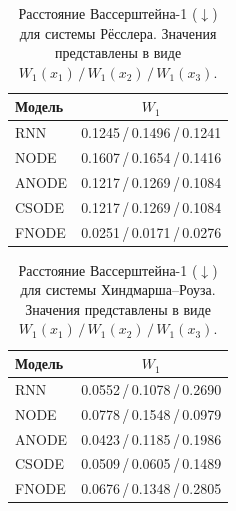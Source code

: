 \documentclass[PMI,VKR]{HSEUniversity}
\begin{document}
\begin{table}[H]
    \centering
    \label{tab:w1_rossler}
    \begin{tabular}{lc}
        \toprule
        Модель & $W_1$ \\
        \midrule
        RNN   & 0.1245\,/\,0.1496\,/\,0.1241 \\
        NODE  & 0.1607\,/\,0.1654\,/\,0.1416 \\
        ANODE & \cellcolor{secondblue}0.1217\,/\,0.1269\,/\,0.1084 \\
        CSODE & \cellcolor{secondblue}0.1217\,/\,0.1269\,/\,0.1084 \\
        FNODE & \cellcolor{bestgreen}0.0251\,/\,0.0171\,/\,0.0276 \\
        \bottomrule
    \end{tabular}
    \caption{Расстояние Вассерштейна-1 ($\downarrow$) для системы Рёсслера.
              Значения представлены в виде $W_1(x_1)\,/\, W_1(x_2)\,/\, W_1(x_3)$.}
    
\end{table}

\begin{table}[H]
    \centering
    \label{tab:w1_hr}
    \begin{tabular}{lc}
        \toprule
        Модель & $W_1$ \\
        \midrule
        RNN   & 0.0552\,/\,0.1078\,/\,0.2690 \\
        NODE  & \cellcolor{secondblue}0.0778\,/\,0.1548\,/\,0.0979 \\
        ANODE & 0.0423\,/\,0.1185\,/\,0.1986 \\
        CSODE & \cellcolor{bestgreen}0.0509\,/\,0.0605\,/\,0.1489 \\
        FNODE & 0.0676\,/\,0.1348\,/\,0.2805 \\
        \bottomrule
    \end{tabular}
    \caption{Расстояние Вассерштейна-1 ($\downarrow$) для системы Хиндмарша--Роуза.
              Значения представлены в виде $W_1(x_1)\,/\, W_1(x_2)\,/\, W_1(x_3)$.}
    
\end{table}
\end{document}
